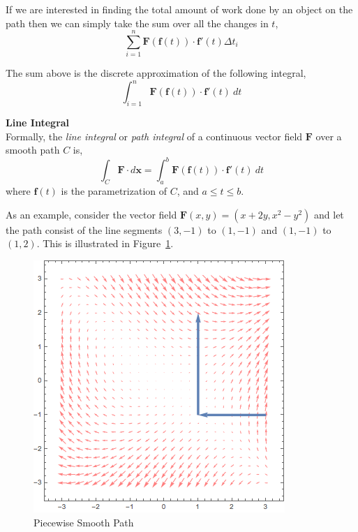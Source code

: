\documentclass[12pt]{article}
\begin{document}
 If we are interested in finding the total amount of work done by an object on the path then we can simply take the sum over all the changes in $t$,
\[
\sum_{i=1}^{n} \mathbf{F}(\mathbf{f}(t)) \cdot \mathbf{f}'(t)\Delta t_i
\]

 The sum above is the discrete approximation of the following integral,
\[
\int_{i=1}^{n} \mathbf{F}(\mathbf{f}(t)) \cdot \mathbf{f}'(t)\  dt
\]

\begin{framed}
\textbf{Line Integral} \\
 Formally, the \emph{line integral} or \emph{path integral} of a continuous vector field $\mathbf{F}$ over a smooth path $C$ is,
\[
\int_{C} \mathbf{F}\cdot d\mathbf{x} = \int_{a}^{b} \mathbf{F}(\mathbf{f}(t)) \cdot \mathbf{f}'(t)\  dt
\]
where $\mathbf{f}(t)$ is the parametrization of $C$, and $a\leq t\leq b$. \\
\end{framed}

 As an example, consider the vector field $\mathbf{F}(x,y) = (x+2y, x^2-y^2)$ and let the path consist of the line segments $(3,-1)$ to $(1,-1)$ and $(1,-1)$ to $(1,2)$. This is illustrated in Figure~\ref{fig:lineintegralexample}.

\begin{figure}[h]
\centering
\caption{Piecewise Smooth Path}
\label{fig:lineintegralexample}
\indent\includegraphics[scale=0.6]{line_integral_example.png}
\end{figure}
\end{document}
